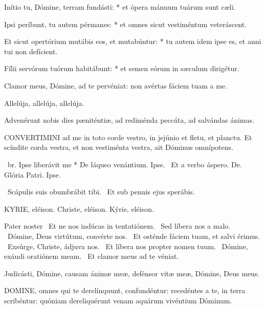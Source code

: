 Inítio tu, Dómine, terram fundásti: * et ópera mánuum tuárum sunt cæli.

Ipsi períbunt, tu autem pérmanes: * et omnes sicut vestiméntum veteráscent.

Et sicut opertórium mutábis eos, et mutabúntur: * tu autem idem ipse es, et anni tui non defícient.

Fílii servórum tuórum habitábunt: * et semen eórum in sæculum dirigétur.

  Clamor meus, Dómine, ad te pervéniat: non avértas fáciem tuam a me.

  Allelúja, allelúja, allelúja.



 Advenérunt nobis dies pæniténtiæ, ad rediménda peccáta, ad salvándas ánimas.


\lettrine[lines=2]{C}{ONVERTIMINI} ad me in toto corde vestro, in jejúnio et fletu, et planctu. Et scíndite corda vestra, et non vestiménta vestra, ait Dóminus omnípotens.

\R\ br. Ipse liberávit me * De láqueo venántium. Ipse. \V\ Et a verbo áspero. De. Glória Patri. Ipse.

\V\ Scápulis suis obumbrábit tibi. \R\ Et sub pennis ejus sperábis.


KYRIE, eléison. Christe, eléison. Kýrie, eléison.

Pater noster  \V\ Et ne nos indúcas in tentatiónem. \R\ Sed líbera nos a malo. \V\ Dómine, Deus virtútum, convérte nos. \R\ Et osténde fáciem tuam, et salvi érimus. \V\ Exsúrge, Christe, ádjuva nos. \R\ Et líbera nos propter nomen tuum. \V\ Dómine, exáudi oratiónem meam. \R\ Et clamor meus ad te véniat.




 Judicásti, Dómine, causam ánimæ meæ, defénsor vitæ meæ, Dómine, Deus meus.


\lettrine[lines=2]{D}{OMINE}, omnes qui te derelínquunt, confundéntur: recedéntes a te, in terra scribéntur: quóniam dereliquérunt venam aquárum vivéntium Dóminum.

